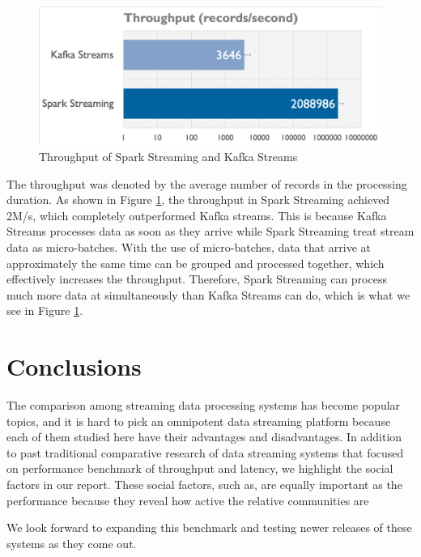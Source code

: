 \documentclass[pdftex,twocolumn,10pt,letterpaper]{article}
\begin{document}
\begin{figure}
    \centering
    \includegraphics[width=\linewidth]{throughput.png}
    \caption{Throughput of Spark Streaming and Kafka Streams}
    \label{fig:throughput}
\end{figure}


The throughput was denoted by the average number of records in the processing duration. As shown in Figure \ref{fig:throughput}, the throughput in Spark Streaming achieved 2M/s, which completely outperformed Kafka streams. This is because Kafka Streams processes data as soon as they arrive while Spark Streaming treat stream data as micro-batches. With the use of micro-batches, data that arrive at approximately the same time can be grouped and processed together, which effectively increases the throughput. Therefore, Spark Streaming can process much more data at simultaneously than Kafka Streams can do, which is what we see in Figure \ref{fig:throughput}. 

\section{Conclusions}
The comparison among streaming data processing systems has become popular topics, and it is hard to pick an omnipotent data streaming platform because each of them studied here have their advantages and disadvantages. In addition to past traditional comparative research of data streaming systems that focused on performance benchmark of throughput and latency, we highlight the social factors in our report. These social factors, such as, are equally important as the performance because they reveal how active the relative communities are

We look forward to expanding this benchmark and testing newer releases of these systems as they come out.


{
    
    
}
\end{document}
